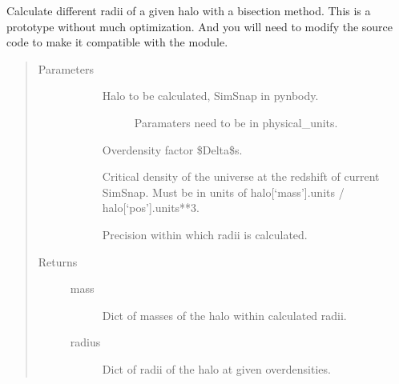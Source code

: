 \documentclass[letterpaper,10pt,english]{sphinxmanual}
\begin{document}

\begin{fulllineitems}
\label{\detokenize{calculate_R:modules.calculate_R.get_radius_bisection}}
Calculate different radii of a given halo with a 
bisection method. This is a prototype without much 
optimization. And you will need to modify the source 
code to make it compatible with the module.
\begin{quote}\begin{description}
\item[{Parameters}] \leavevmode\begin{description}
\item[{}] \leavevmode\begin{description}
\item[{Halo to be calculated, SimSnap in pynbody.}] \leavevmode
Paramaters need to be in physical\_units.

\end{description}

\item[{}] \leavevmode
Overdensity factor \$Delta\$s.

\item[{}] \leavevmode
Critical density of the universe at the
redshift of current SimSnap. Must be in
units of halo{[}‘mass’{]}.units / 
halo{[}‘pos’{]}.units**3.

\item[{}] \leavevmode
Precision within which radii is calculated.

\end{description}

\item[{Returns}] \leavevmode\begin{description}
\item[{mass}] \leavevmode
Dict of masses of the halo within calculated radii.

\item[{radius}] \leavevmode
Dict of radii of the halo at given overdensities.

\end{description}

\end{description}\end{quote}

\end{fulllineitems}
\end{document}
